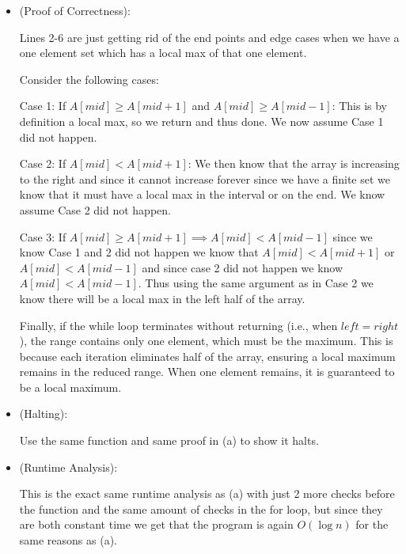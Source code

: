 \documentclass[12pt, letterpaper]{article}
\theoremstyle{definition}
\begin{document}
\begin{enumerate}[(a)]
        \begin{itemize}
            \item (Proof of Correctness):
            
            Lines 2-6 are just getting rid of the end points and edge cases when we have a one element set which has a local max of that one element.

            Consider the following cases:
    
            Case 1: If $A[mid] \geq A[mid + 1]$ and $A[mid] \geq A[mid - 1]$: This is by definition a local max, so we return and thus done. We now assume Case 1 did not happen.

            Case 2: If $A[mid] < A[mid + 1]$: We then know that the array is increasing to the right and since it cannot increase forever since we have a finite set we know that it must have a local max in the interval or on the end. We know assume Case 2 did not happen.

            Case 3: If $A[mid]  \geq A[mid + 1] \implies A[mid] < A[mid - 1]$ since we know Case 1 and 2 did not happen we know that $A[mid] < A[mid + 1]$ or $A[mid] < A[mid-1]$ and since case 2 did not happen we know $A[mid] < A[mid -1]$. Thus using the same argument as in Case 2 we know there will be a local max in the left half of the array.
            
            Finally, if the while loop terminates without returning (i.e., when $left = right$), the range contains only one element, which must be the maximum. This is because each iteration eliminates half of the array, ensuring a local maximum remains in the reduced range. When one element remains, it is guaranteed to be a local maximum.
        
            \item (Halting):
            
            Use the same function and same proof in (a) to show it halts.

            \item (Runtime Analysis):
            
            This is the exact same runtime analysis as (a) with just 2 more checks before the function and the same amount of checks in the for loop, but since they are both constant time we get that the program is again $O(\log n)$ for the same reasons as (a).
        \end{itemize}
\end{enumerate}

\newpage
\end{document}
